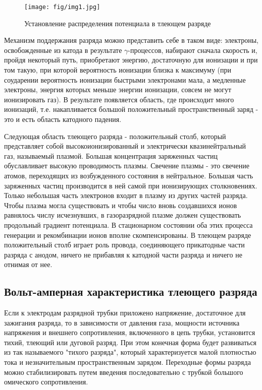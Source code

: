  \begin{figure}[h!]
	\centering
	\texttt{[image: fig/img1.jpg]}
	\caption{Установление распределения потенциала в тлеющем разряде}
	\label{fig:1}
\end{figure}

Механизм поддержания разряда можно представить себе в таком виде: электроны, освобожденные из катода в результате 
$\gamma$-процессов, набирают сначала скорость и, пройдя некоторый путь, приобретают энергию, достаточную для 
ионизации и при том такую, при которой вероятность ионизации близка к максимуму (при соударении вероятность ионизации 
быстрыми электронами мала, а медленные электроны, энергия которых меньше энергии ионизации, совсем не могут 
ионизировать газ). В результате появляется область, где происходит много ионизаций, т.е. накапливается большой
положительный пространственный заряд - это и есть область катодного падения.

Следующая область тлеющего разряда - положительный столб, который представляет собой высокоионизированный и 
электрически квазинейтральный газ, называемый плазмой. Большая концентрация заряженных частиц обуславливает 
высокую проводимость плазмы. Свечение плазмы - это свечение атомов, переходящих из возбужденного состояния в нейтральное.
Большая часть заряженных частиц производится в ней самой при ионизирующих столкновениях. Только небольшая часть 
электронов входит в плазму из других частей разряда. Чтобы плазма могла существовать и чтобы число вновь создавшихся 
ионов равнялось числу исчезнувших, в газоразрядной плазме должен существовать продольный градиент потенциала. В 
стационарном состоянии оба этих процесса генерации и рекомбинации ионов вполне скомпенсированы. В тлеющем разряде 
положительный столб играет роль провода, соединяющего прикатодные части разряда с анодом, ничего не прибавляя к катодной
части разряда и ничего не отнимая от нее.

\subsection{Вольт-амперная характеристика тлеющего разряда}
Если к электродам разрядной трубки приложено напряжение, достаточное для зажигания разряда, то в зависимости от 
давления газа, мощности источника напряжения и внешнего сопротивления, включенного в цепь трубки, установится тихий,
тлеющий или дуговой разряд. При этом конечная форма будет развиваться из так называемого "тихого разряда", который 
характеризуется малой плотностью тока и незначительным пространственным зарядом. Переходные формы разряда можно 
стабилизировать путем введения последовательно с трубкой большого омического сопротивления.

